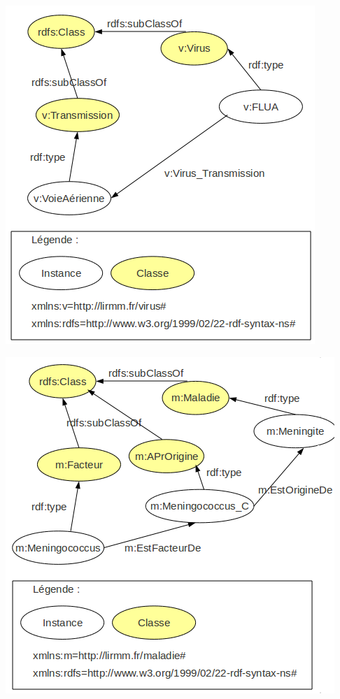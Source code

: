\documentclass[12pt]{article}
\begin{document}
\begin{center}
	\includegraphics[scale=0.60]{rdf/rdf-virusTransmission.png}
\end{center}

\begin{center}
	\includegraphics[scale=0.60]{rdf/rdf-MaladieFacteur.png}
\end{center}
\end{document}
